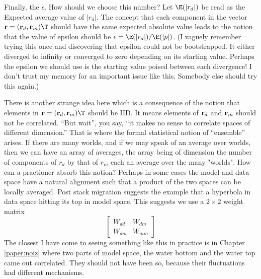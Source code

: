 \par
Finally, the $\epsilon$.  How should we choose this number?
Let $\E(|r_d|)$ be read as the Expected average value of $|r_d|$.
The concept that each component in the vector $\bold r = (\bold r_d,\bold r_m)\T$
should have the same expected absolute value leads to the notion that
the value of epsilon should be
$\epsilon=\E(|r_d|)/\E(|p|)$.
(I vaguely remember trying this once and discovering that epsilon
could not be bootstrapped.  It either diverged to infinity
or converged to zero depending on its starting value.
Perhaps the epsilon we should use is the starting value poised between each divergence!
I don't trust my memory for an important issue like this.
Somebody else should try this again.)

\par
There is another strange idea here which is a consequence
of the notion that elements in  $\bold r = (\bold r_d,\bold r_m)\T$
should be IID.
It means elements of $\bold r_d$ and $\bold r_m$ should not be correlated.
``But wait'', you say, ``it makes no sense to correlate spaces of different dimension.''
That is where the formal statistical notion of ``ensemble'' arises.
If there are many worlds, and if we may speak of an average over worlds,
then we can have an array of averages,
the array being of dimension the number of components of $r_d$ by that of $r_m$
each an average over the many "worlds".
How can a practioner absorb this notion?
Perhaps in some cases the model and data space have a natural alignment
such that a product of the two spaces can be locally averaged.
Post stack migration suggests the example
that a hyperbola in data space hitting its top in model space.
This suggests we use a $2\times 2$ weight matrix
\begin{equation}
\left[
\begin{array}{cc}
	W_{dd}  &  W_{dm}
	\\
	W_{dm}  &  W_{mm}
\end{array}
\right]
\end{equation}
The closest I have come to seeing something like this in practice is in
Chapter \ref{paper:noiz}
where two parts of model space,
the water bottom and the water top
came out correlated.
They should not have been so,
because their fluctuations had different mechanisms.


